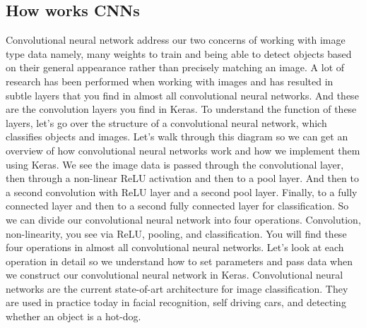 \subsection{How works CNNs}
\label{ssec:cnnworks}
%
Convolutional neural network address our two concerns of working with image 
type data namely, many weights to train and being able to detect objects based 
on their general appearance rather than precisely matching an image. 
A lot of research has been performed when working with images and has 
resulted in subtle layers that you find in almost all convolutional neural 
networks. 
And these are the convolution layers you find in Keras. 
To understand the function of these layers, let's go over the structure of a 
convolutional neural network, which classifies objects and images.
%
Let's walk through this diagram so we can get an overview of how convolutional 
neural networks work and how we implement them using Keras. 
We see the image data is passed through the convolutional layer, then through 
a non-linear ReLU activation and then to a pool layer. 
And then to a second convolution with ReLU layer and a second pool layer. 
Finally, to a fully connected layer and then to a second fully connected 
layer for classification. 
So we can divide our convolutional neural network into four operations. 
Convolution, non-linearity, you see via ReLU, pooling, and classification. 
You will find these four operations in almost all convolutional neural networks. 
Let's look at each operation in detail so we understand how to set parameters 
and pass data when we construct our convolutional neural network in Keras.
Convolutional neural networks are the current state-of-art architecture for
image classification. They are used in practice today in facial recognition, self
driving cars, and detecting whether an object is a hot-dog.
%
